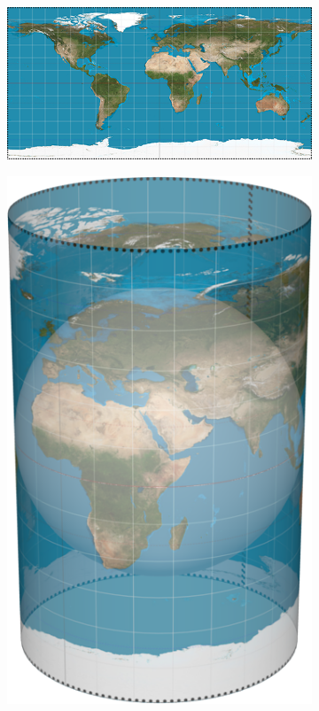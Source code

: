 \begin{figure}[htbp]
    \centering
    \begin{subfigure}[bt]{0.4\textwidth}
        \includegraphics[width=\textwidth]{figures/developable_projected/equirectangular.png}
    \end{subfigure}
    \qquad
    \begin{subfigure}[bt]{0.15\textwidth}
        \includegraphics[width=\textwidth]{figures/map_projection/projection_geo.png}

\end{subfigure}
\end{figure}
